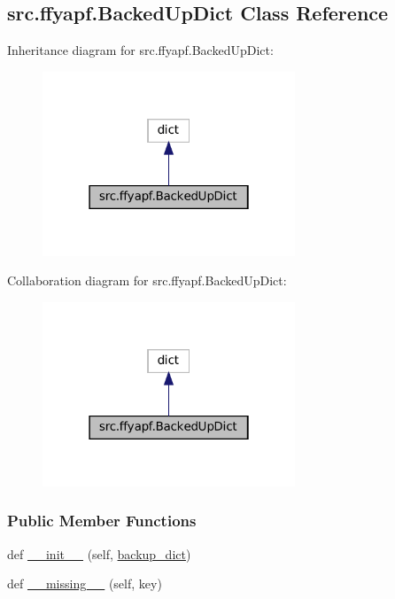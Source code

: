\hypertarget{classsrc_1_1ffyapf_1_1BackedUpDict}{}\subsection{src.\+ffyapf.\+Backed\+Up\+Dict Class Reference}
\label{classsrc_1_1ffyapf_1_1BackedUpDict}


Inheritance diagram for src.\+ffyapf.\+Backed\+Up\+Dict\+:
\nopagebreak
\begin{figure}[H]
\begin{center}
\leavevmode
\includegraphics[width=214pt]{classsrc_1_1ffyapf_1_1BackedUpDict__inherit__graph}
\end{center}
\end{figure}


Collaboration diagram for src.\+ffyapf.\+Backed\+Up\+Dict\+:
\nopagebreak
\begin{figure}[H]
\begin{center}
\leavevmode
\includegraphics[width=214pt]{classsrc_1_1ffyapf_1_1BackedUpDict__coll__graph}
\end{center}
\end{figure}
\subsubsection*{Public Member Functions}
\begin{DoxyCompactItemize}
\item 
def \hyperlink{classsrc_1_1ffyapf_1_1BackedUpDict_a9fa35c2def371c3c9a209500adb9ef55}{\+\_\+\+\_\+init\+\_\+\+\_\+} (self, \hyperlink{classsrc_1_1ffyapf_1_1BackedUpDict_a431ca6a61be2b6eafaed4f6611c2e149}{backup\+\_\+dict})
\item 
def \hyperlink{classsrc_1_1ffyapf_1_1BackedUpDict_a95cc9d839346ad8ac80f3f08e696bd41}{\+\_\+\+\_\+missing\+\_\+\+\_\+} (self, key)
\end{DoxyCompactItemize}
